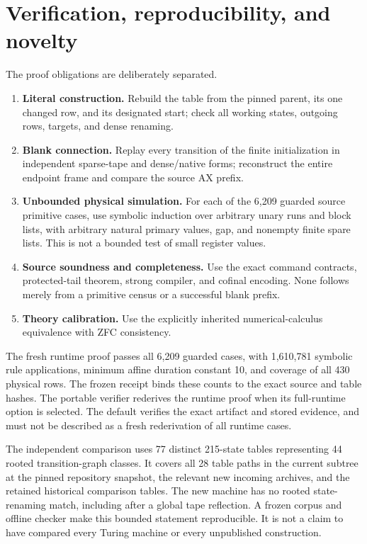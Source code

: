 \section{Verification, reproducibility, and novelty}
The proof obligations are deliberately separated.
\begin{enumerate}
\item \textbf{Literal construction.} Rebuild the table from the pinned parent, its one changed row, and its designated start; check all working states, outgoing rows, targets, and dense renaming.
\item \textbf{Blank connection.} Replay every transition of the finite initialization in independent sparse-tape and dense/native forms; reconstruct the entire endpoint frame and compare the source AX prefix.
\item \textbf{Unbounded physical simulation.} For each of the 6,209 guarded source primitive cases, use symbolic induction over arbitrary unary runs and block lists, with arbitrary natural primary values, gap, and nonempty finite spare lists. This is not a bounded test of small register values.
\item \textbf{Source soundness and completeness.} Use the exact command contracts, protected-tail theorem, strong compiler, and cofinal encoding. None follows merely from a primitive census or a successful blank prefix.
\item \textbf{Theory calibration.} Use the explicitly inherited numerical-calculus equivalence with ZFC consistency.
\end{enumerate}
The fresh runtime proof passes all 6,209 guarded cases, with 1,610,781 symbolic rule applications, minimum affine duration constant 10, and coverage of all 430 physical rows. The frozen receipt binds these counts to the exact source and table hashes. The portable verifier rederives the runtime proof when its full-runtime option is selected. The default verifies the exact artifact and stored evidence, and must not be described as a fresh rederivation of all runtime cases.

The independent comparison uses 77 distinct 215-state tables representing 44 rooted transition-graph classes. It covers all 28 table paths in the current  subtree at the pinned repository snapshot, the relevant new incoming archives, and the retained historical comparison tables. The new machine has no rooted state-renaming match, including after a global tape reflection. A frozen corpus and offline checker make this bounded statement reproducible. It is not a claim to have compared every Turing machine or every unpublished construction.

